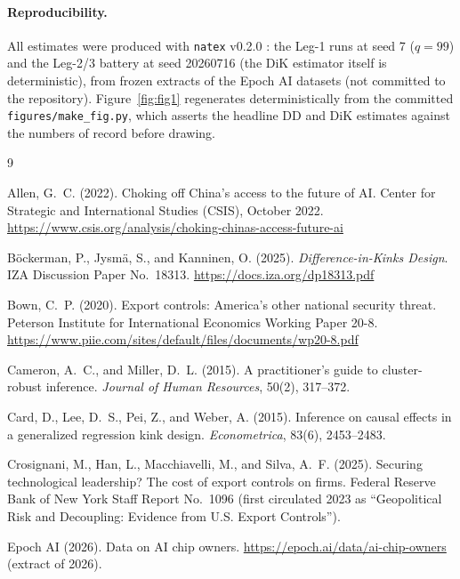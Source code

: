 \documentclass[11pt]{article}
\newcommand{\natex}{\texttt{natex}}
\begin{document}
\paragraph{Reproducibility.} All estimates were produced with \natex{}
v0.2.0 \cite{natex}: the Leg-1 runs at seed 7 ($q=99$) and the Leg-2/3
battery at seed 20260716 (the DiK estimator itself is deterministic), from
frozen extracts of the Epoch AI datasets \cite{epochmodels,epochchips} (not
committed to the repository). Figure~\ref{fig:fig1} regenerates
deterministically from the committed \texttt{figures/make\_fig.py}, which
asserts the headline DD and DiK estimates against the numbers of record
before drawing.

\footnotesize
\begin{thebibliography}{9}
\setlength{\itemsep}{2pt}\setlength{\parskip}{0pt}

Allen, G.~C. (2022).
Choking off China's access to the future of AI.
Center for Strategic and International Studies (CSIS), October 2022.
\url{https://www.csis.org/analysis/choking-chinas-access-future-ai}

B\"ockerman, P., Jysm\"a, S., and Kanninen, O. (2025).
\emph{Difference-in-Kinks Design}.
IZA Discussion Paper No.~18313.
\url{https://docs.iza.org/dp18313.pdf}

Bown, C.~P. (2020).
Export controls: America's other national security threat.
Peterson Institute for International Economics Working Paper 20-8.
\url{https://www.piie.com/sites/default/files/documents/wp20-8.pdf}

Cameron, A.~C., and Miller, D.~L. (2015).
A practitioner's guide to cluster-robust inference.
\emph{Journal of Human Resources}, 50(2), 317--372.

Card, D., Lee, D.~S., Pei, Z., and Weber, A. (2015).
Inference on causal effects in a generalized regression kink design.
\emph{Econometrica}, 83(6), 2453--2483.

Crosignani, M., Han, L., Macchiavelli, M., and Silva, A.~F. (2025).
Securing technological leadership? The cost of export controls on firms.
Federal Reserve Bank of New York Staff Report No.~1096 (first circulated 2023
as ``Geopolitical Risk and Decoupling: Evidence from U.S. Export
Controls'').

Epoch AI (2026).
Data on AI chip owners.
\url{https://epoch.ai/data/ai-chip-owners} (extract of 2026).


\end{thebibliography}
\end{document}
